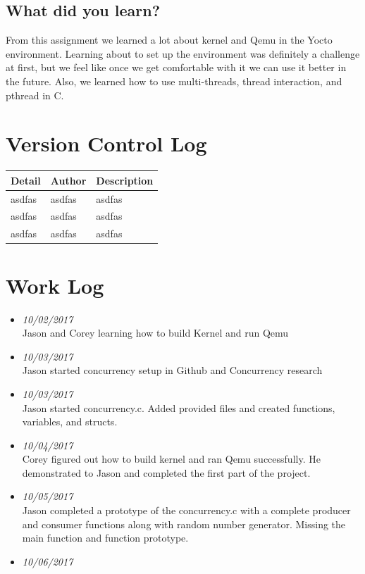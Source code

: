 \documentclass[onecolumn, draftclsnofoot,10pt, compsoc]{IEEEtran}
\begin{document}
\subsection{What did you learn?}
\noindent 
From this assignment we learned a lot about kernel and Qemu in the Yocto environment. Learning about to set up the environment was definitely a challenge at first, but we feel like once we get comfortable with it we can use it better in the future. Also, we learned how to use multi-threads, thread interaction, and pthread in C.   
\\ 
\section{Version Control Log}
\begin{tabular}{l l l}
\textbf{Detail} & \textbf{Author} & \textbf{Description}\\
\hline asdfas & asdfas & asdfas  \\
\hline asdfas & asdfas & asdfas  \\
\hline asdfas & asdfas & asdfas  \\

\end{tabular}


\section{Work Log}
\begin{itemize}
\item \textit{10/02/2017}\\ Jason and Corey learning how to build Kernel and run Qemu \\
\item \textit{10/03/2017}\\ Jason started concurrency setup in Github and Concurrency research\\
\item \textit{10/03/2017}\\ Jason started concurrency.c. Added provided files and created functions, variables, and structs.  \\
\item \textit{10/04/2017}\\ Corey figured out how to build kernel and ran Qemu successfully. He demonstrated to Jason and completed the first part of the project.\\ 
\item \textit{10/05/2017}\\ Jason completed a prototype of the concurrency.c with a complete producer and consumer functions along with random number generator. Missing the main function and function prototype. \\
\item \textit{10/06/2017}\\



\end{itemize}
\end{document}
